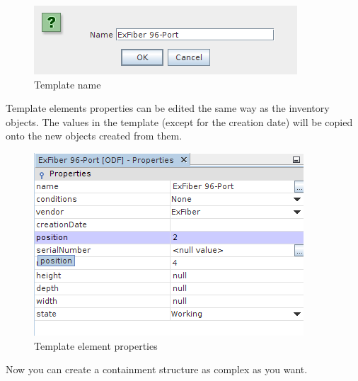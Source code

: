\documentclass[a4paper]{article}
\begin{document}
	\begin{figure}[h!]
		\centering
		\includegraphics[width=0.6\linewidth]{img/template_manager_template_name.png}
		\caption{Template name}
		\label{fig:template_manager_name}
	\end{figure}
	
	Template elements properties can be edited the same way as the inventory objects. The values in the template (except for the creation date) will be copied onto the new objects created from them.
	\newpage
	\begin{figure}[h!]
		\centering
		\includegraphics[width=0.6\linewidth]{img/template_manager_template_properties.png}
		\caption{Template element properties}
		\label{fig:template_manager_template_properties}
	\end{figure}
	
	Now you can create a containment structure as complex as you want.\\
	
\end{document}
